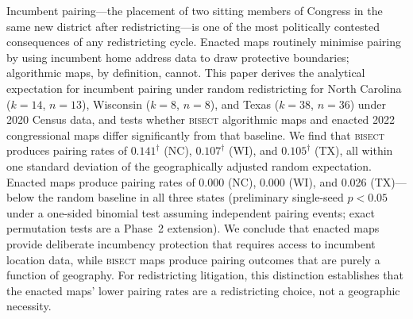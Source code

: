 Incumbent pairing---the placement of two sitting members of Congress in the same
new district after redistricting---is one of the most politically contested consequences
of any redistricting cycle. Enacted maps routinely minimise pairing by using incumbent
home address data to draw protective boundaries; algorithmic maps, by definition,
cannot. This paper derives the analytical expectation for incumbent pairing under
random redistricting for North Carolina ($k=14$, $n=13$), Wisconsin ($k=8$, $n=8$),
and Texas ($k=38$, $n=36$) under 2020 Census data, and tests whether \textsc{bisect}
algorithmic maps and enacted 2022 congressional maps differ significantly from that
baseline. We find that \textsc{bisect} produces pairing rates of $0.141^\dagger$ (NC),
$0.107^\dagger$ (WI), and $0.105^\dagger$ (TX), all within one standard deviation of
the geographically adjusted random expectation. Enacted maps produce pairing rates of
0.000 (NC), 0.000 (WI), and 0.026 (TX)---below the random baseline in
all three states (preliminary single-seed $p < 0.05$ under a one-sided binomial test
assuming independent pairing events; exact permutation tests are a Phase~2 extension). We conclude that enacted
maps provide deliberate incumbency protection that requires access to incumbent location
data, while \textsc{bisect} maps produce pairing outcomes that are purely a function of
geography. For redistricting litigation, this distinction establishes that the enacted
maps' lower pairing rates are a redistricting choice, not a geographic necessity.

